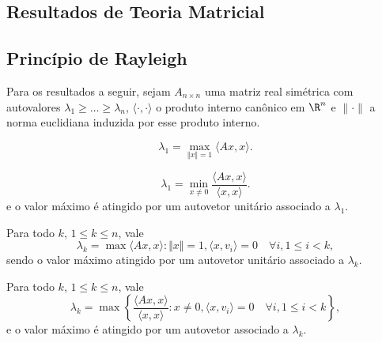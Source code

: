 \documentclass{article}
\begin{document}
\begin{appendix}

\section{Resultados de Teoria Matricial}

\subsection{Princípio de Rayleigh}

Para os resultados a seguir, sejam \(A_{n \times n}\) uma matriz real simétrica com autovalores \(\lambda_1 \geq \ldots \geq \lambda_n\), \(\langle \cdot, \cdot \rangle\) o produto interno canônico em \(\R^n\) e \(\|\cdot\|\) a norma euclidiana induzida por esse produto interno.



\begin{prop}
    \begin{equation}
        \lambda_1 = \max_{\Vert x \Vert = 1} \langle Ax, x \rangle.
    \end{equation}
\end{prop}

\begin{cor}
    \begin{equation}
        \lambda_1 = \min_{x \neq 0} \frac{\langle Ax, x \rangle}{\langle x, x \rangle}.
    \end{equation}
    e o valor máximo é atingido por um autovetor unitário associado a \(\lambda_1\).
\end{cor}

\begin{prop}
    Para todo \(k\), \(1 \leq k \leq n\), vale
    \begin{equation}
        \lambda_k = \max{\langle Ax, x \rangle : \Vert x \Vert = 1, \langle x, v_i \rangle = 0 \quad\forall i, 1 \leq i < k},
    \end{equation}
    sendo o valor máximo atingido por um autovetor unitário associado a \(\lambda_k\).
\end{prop}

\begin{cor}
    Para todo \(k\), \(1 \leq k \leq n\), vale
    \begin{equation}
        \lambda_k = \max\left\{\frac{\langle Ax, x \rangle}{\langle x, x \rangle} : x \neq 0, \langle x, v_i \rangle = 0 \quad\forall i, 1 \leq i < k\right\},
    \end{equation}
    e o valor máximo é atingido por um autovetor associado a \(\lambda_k\).
\end{cor}


\end{appendix}
\end{document}
